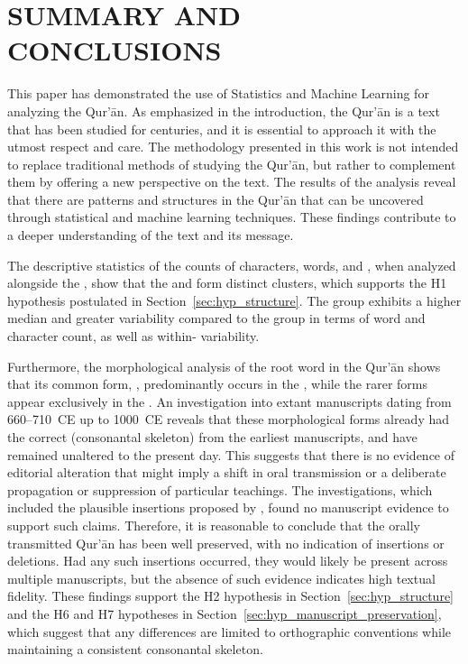 \chapter{SUMMARY AND CONCLUSIONS}\label{ch:conclusion}

This paper has demonstrated the use of Statistics and Machine Learning for analyzing the Qur'\=an. As emphasized in the introduction, the Qur'\=an is a text that has been studied for centuries, and it is essential to approach it with the utmost respect and care. The methodology presented in this work is not intended to replace traditional methods of studying the Qur'\=an, but rather to complement them by offering a new perspective on the text. The results of the analysis reveal that there are patterns and structures in the Qur'\=an that can be uncovered through statistical and machine learning techniques. These findings contribute to a deeper understanding of the text and its message.

The descriptive statistics of the counts of characters, words, and  , when analyzed alongside the  , show that the   and     form distinct clusters, which supports the H1 hypothesis postulated in Section~\ref{sec:hyp_structure}. The   group exhibits a higher median and greater variability compared to the   group in terms of word and character count, as well as within-  variability.

Furthermore, the morphological analysis of the root word   in the Qur'\=an shows that its common form,  , predominantly occurs in the  , while the rarer forms appear exclusively in the  . An investigation into extant manuscripts dating from 660–710~CE up to 1000~CE reveals that these morphological forms already had the correct   (consonantal skeleton) from the earliest manuscripts, and have remained unaltered to the present day. This suggests that there is no evidence of editorial alteration that might imply a shift in oral transmission or a deliberate propagation or suppression of particular teachings. The investigations, which included the plausible insertions proposed by , found no manuscript evidence to support such claims. Therefore, it is reasonable to conclude that the orally transmitted Qur'\=an has been well preserved, with no indication of insertions or deletions. Had any such insertions occurred, they would likely be present across multiple manuscripts, but the absence of such evidence indicates high textual fidelity. These findings support the H2 hypothesis in Section~\ref{sec:hyp_structure} and the H6 and H7 hypotheses in Section~\ref{sec:hyp_manuscript_preservation}, which suggest that any differences are limited to orthographic conventions while maintaining a consistent consonantal skeleton.

